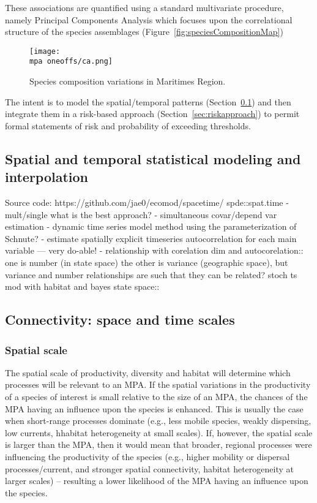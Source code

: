 \documentclass[letterpaper,portrait,11pt]{scrartcl}
\numberwithin{equation}{section}		%
\numberwithin{figure}{section}			%
\numberwithin{table}{section}				%
\newcommand{\ecomod}{\string~/ecomod_data/}   %
\newcommand{\mpa}{\ecomod/mpa/}       %
\begin{document}
These associations are quantified using a standard multivariate procedure, namely Principal Components Analysis which focuses upon the correlational structure of the species assemblages (Figure~\ref{fig:speciesCompositionMap}) 

\begin{figure}[h]
  \label{fig:speciesCompostionMap}
  \centering
  \texttt{[image: \\mpa oneoffs/ca.png]}
  \caption{Species composition variations in Maritimes Region.}
\end{figure}

The intent is to model the spatial/temporal patterns (Section~\ref{sec:interpolation}) and then integrate them in a risk-based approach (Section~\ref{sec:riskapproach}) to permit formal statements of risk and probability of exceeding thresholds. 



\subsection{Spatial and temporal statistical modeling and interpolation}
\label{sec:interpolation}
Source code: https://github.com/jae0/ecomod/spacetime/
	spde::spat.time
- mult/single what is the best approach?
- simultaneous covar/depend var estimation
- dynamic time series model method using the parameterization of Schnute?
- estimate spatially explicit timeseries autocorrelation for each main variable --- very do-able!
- relationship with corelation dim and autocorelation:: one is number (in state space) the other is variance (geographic space), but variance and number relationships are such that they can be related?
	stoch ts mod with habitat and bayes state space::


\subsection{Connectivity: space and time scales}

\subsubsection{Spatial scale}

The spatial scale of productivity, diversity and habitat will determine which processes will be relevant to an MPA. If the spatial variations in the productivity of a species of interest is small relative to the size of an MPA, the chances of the MPA having an influence upon the species is enhanced. This is usually the case when short-range processes dominate (e.g., less mobile species, weakly dispersing, low currents, hhabitat heterogeneity at small scales). If, however, the spatial scale is larger than the MPA, then it would mean that broader, regional processes were influencing the productivity of the species (e.g., higher mobility or dispersal processes/current, and stronger spatial connectivity, habitat heterogeneity at larger scales) -- resulting a lower likelihood of the MPA having an influence upon the species. 
\end{document}
